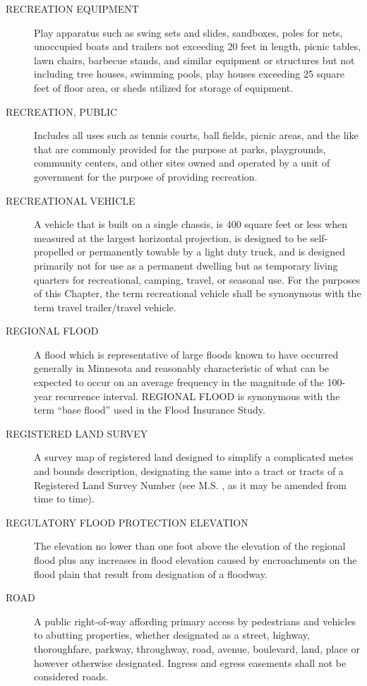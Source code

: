 \begin{description}
    \item[RECREATION EQUIPMENT] Play apparatus such as swing sets and slides, sandboxes, poles for nets, unoccupied boats and trailers not exceeding 20 feet in length, picnic tables, lawn chairs, barbecue stands, and similar equipment or structures but not including tree houses, swimming pools, play houses exceeding 25 square feet of floor area, or sheds utilized for storage of equipment.
    \item[RECREATION, PUBLIC] Includes all uses such as tennis courts, ball fields, picnic areas, and the like that are commonly provided for the purpose at parks, playgrounds, community centers, and other sites owned and operated by a unit of government for the purpose of providing recreation.
    \item[RECREATIONAL VEHICLE] A vehicle that is built on a single chassis, is 400 square feet or less when measured at the largest horizontal projection, is designed to be self-propelled or permanently towable by a light duty truck, and is designed primarily not for use as a permanent dwelling but as temporary living quarters for recreational, camping, travel, or seasonal use. For the purposes of this Chapter, the term recreational vehicle shall be synonymous with the term travel trailer/travel vehicle.
    \item[REGIONAL FLOOD] A flood which is representative of large floods known to have occurred generally in Minnesota and reasonably characteristic of what can be expected to occur on an average frequency in the magnitude of the 100-year recurrence interval. REGIONAL FLOOD is synonymous with the term “base flood” used in the Flood Insurance Study.
    \item[REGISTERED LAND SURVEY] A survey map of registered land designed to simplify a complicated metes and bounds description, designating the same into a tract or tracts of a Registered Land Survey Number (see M.S. , as it may be amended from time to time).
    \item[REGULATORY FLOOD PROTECTION ELEVATION] The elevation no lower than one foot above the elevation of the regional flood plus any increases in flood elevation caused by encroachments on the flood plain that result from designation of a floodway.
    \item[ROAD] A public right-of-way affording primary access by pedestrians and vehicles to abutting properties, whether designated as a street, highway, thoroughfare, parkway, throughway, road, avenue, boulevard, land, place or however otherwise designated. Ingress and egress easements shall not be considered roads.

\end{description}
